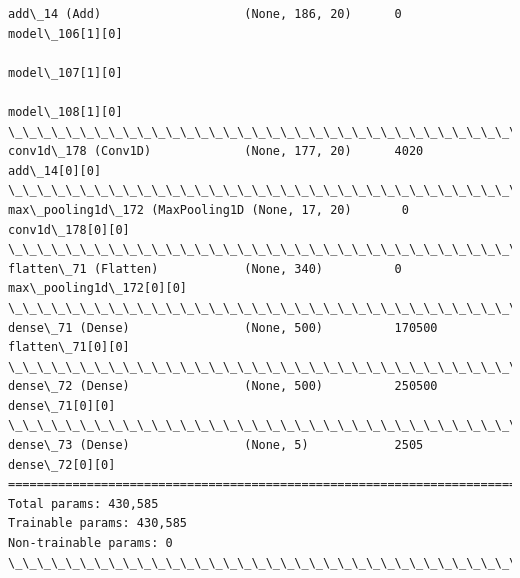 \documentclass[11pt]{article}
\begin{document}
\begin{Verbatim}[commandchars=\\\{\}]
add\_14 (Add)                    (None, 186, 20)      0           model\_106[1][0]                  
                                                                 model\_107[1][0]                  
                                                                 model\_108[1][0]                  
\_\_\_\_\_\_\_\_\_\_\_\_\_\_\_\_\_\_\_\_\_\_\_\_\_\_\_\_\_\_\_\_\_\_\_\_\_\_\_\_\_\_\_\_\_\_\_\_\_\_\_\_\_\_\_\_\_\_\_\_\_\_\_\_\_\_\_\_\_\_\_\_\_\_\_\_\_\_\_\_\_\_\_\_\_\_\_\_\_\_\_\_\_\_\_\_\_\_
conv1d\_178 (Conv1D)             (None, 177, 20)      4020        add\_14[0][0]                     
\_\_\_\_\_\_\_\_\_\_\_\_\_\_\_\_\_\_\_\_\_\_\_\_\_\_\_\_\_\_\_\_\_\_\_\_\_\_\_\_\_\_\_\_\_\_\_\_\_\_\_\_\_\_\_\_\_\_\_\_\_\_\_\_\_\_\_\_\_\_\_\_\_\_\_\_\_\_\_\_\_\_\_\_\_\_\_\_\_\_\_\_\_\_\_\_\_\_
max\_pooling1d\_172 (MaxPooling1D (None, 17, 20)       0           conv1d\_178[0][0]                 
\_\_\_\_\_\_\_\_\_\_\_\_\_\_\_\_\_\_\_\_\_\_\_\_\_\_\_\_\_\_\_\_\_\_\_\_\_\_\_\_\_\_\_\_\_\_\_\_\_\_\_\_\_\_\_\_\_\_\_\_\_\_\_\_\_\_\_\_\_\_\_\_\_\_\_\_\_\_\_\_\_\_\_\_\_\_\_\_\_\_\_\_\_\_\_\_\_\_
flatten\_71 (Flatten)            (None, 340)          0           max\_pooling1d\_172[0][0]          
\_\_\_\_\_\_\_\_\_\_\_\_\_\_\_\_\_\_\_\_\_\_\_\_\_\_\_\_\_\_\_\_\_\_\_\_\_\_\_\_\_\_\_\_\_\_\_\_\_\_\_\_\_\_\_\_\_\_\_\_\_\_\_\_\_\_\_\_\_\_\_\_\_\_\_\_\_\_\_\_\_\_\_\_\_\_\_\_\_\_\_\_\_\_\_\_\_\_
dense\_71 (Dense)                (None, 500)          170500      flatten\_71[0][0]                 
\_\_\_\_\_\_\_\_\_\_\_\_\_\_\_\_\_\_\_\_\_\_\_\_\_\_\_\_\_\_\_\_\_\_\_\_\_\_\_\_\_\_\_\_\_\_\_\_\_\_\_\_\_\_\_\_\_\_\_\_\_\_\_\_\_\_\_\_\_\_\_\_\_\_\_\_\_\_\_\_\_\_\_\_\_\_\_\_\_\_\_\_\_\_\_\_\_\_
dense\_72 (Dense)                (None, 500)          250500      dense\_71[0][0]                   
\_\_\_\_\_\_\_\_\_\_\_\_\_\_\_\_\_\_\_\_\_\_\_\_\_\_\_\_\_\_\_\_\_\_\_\_\_\_\_\_\_\_\_\_\_\_\_\_\_\_\_\_\_\_\_\_\_\_\_\_\_\_\_\_\_\_\_\_\_\_\_\_\_\_\_\_\_\_\_\_\_\_\_\_\_\_\_\_\_\_\_\_\_\_\_\_\_\_
dense\_73 (Dense)                (None, 5)            2505        dense\_72[0][0]                   
==================================================================================================
Total params: 430,585
Trainable params: 430,585
Non-trainable params: 0
\_\_\_\_\_\_\_\_\_\_\_\_\_\_\_\_\_\_\_\_\_\_\_\_\_\_\_\_\_\_\_\_\_\_\_\_\_\_\_\_\_\_\_\_\_\_\_\_\_\_\_\_\_\_\_\_\_\_\_\_\_\_\_\_\_\_\_\_\_\_\_\_\_\_\_\_\_\_\_\_\_\_\_\_\_\_\_\_\_\_\_\_\_\_\_\_\_\_

    \end{Verbatim}
\end{document}
